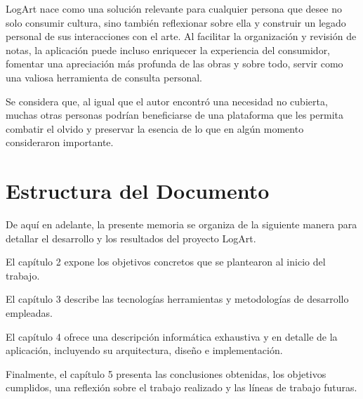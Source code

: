 LogArt nace como una solución relevante para cualquier persona que desee no solo consumir cultura, sino también reflexionar sobre ella y construir un legado personal de sus interacciones con el arte. Al facilitar la organización y revisión de notas, la aplicación puede incluso enriquecer la experiencia del consumidor, fomentar una apreciación más profunda de las obras y sobre todo, servir como una valiosa herramienta de consulta personal.

Se considera que, al igual que el autor encontró una necesidad no cubierta, muchas otras personas podrían beneficiarse de una plataforma que les permita combatir el olvido y preservar la esencia de lo que en algún momento consideraron importante.

\section{Estructura del Documento}

De aquí en adelante, la presente memoria se organiza de la siguiente manera para detallar el desarrollo y los resultados del proyecto LogArt.

El capítulo 2 expone los objetivos concretos que se plantearon al inicio del trabajo.

El capítulo 3 describe las tecnologías herramientas y metodologías de desarrollo empleadas.

El capítulo 4 ofrece una descripción informática exhaustiva y en detalle de la aplicación, incluyendo su arquitectura, diseño e implementación.

Finalmente, el capítulo 5 presenta las conclusiones obtenidas, los objetivos cumplidos, una reflexión sobre el trabajo realizado y las líneas de trabajo futuras.
